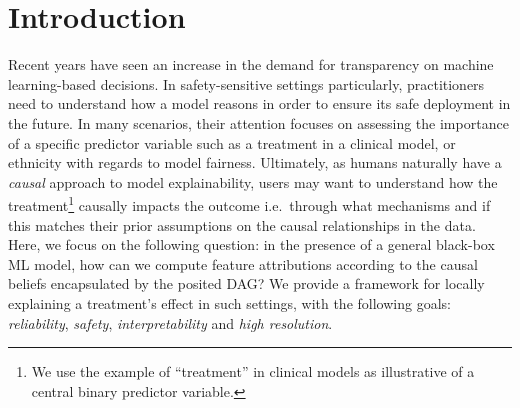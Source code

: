 \documentclass{article}
\theoremstyle{plain}
\theoremstyle{definition}
\theoremstyle{remark}
\theoremstyle{mystyle}
\begin{document}
\section{Introduction}
\label{sec:intro}
Recent years have seen an increase in the demand for transparency on machine learning-based decisions. In safety-sensitive settings particularly, practitioners need to understand how a model reasons in order to ensure its safe deployment in the future. In many scenarios, their attention focuses on assessing the importance of a specific predictor variable such as a treatment in a clinical model, or ethnicity with regards to model fairness. Ultimately, as humans naturally have a \emph{causal} approach to model explainability, users may want to understand how the treatment\footnote{We use the example of ``treatment'' in clinical models as illustrative of a central binary predictor variable.} causally impacts the outcome i.e.\ through what mechanisms and if this matches their prior assumptions on the causal relationships in the data. Here, we focus on the following question: in the presence of a general black-box ML model, how can we compute feature attributions according to the causal beliefs encapsulated by the posited DAG? We provide a framework for locally explaining a treatment's effect in such settings, with the following goals: \textit{reliability}, \textit{safety}, \textit{interpretability} and \textit{high resolution}. 
\end{document}
